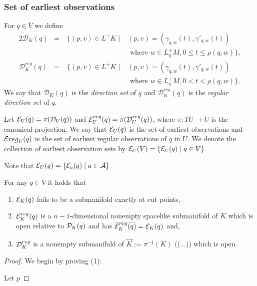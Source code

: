 \subsubsection{Set of earliest observations}
\begin{definition}
For $q\in \overline{V}$ we define
\begin{alignat*}{2}
    \mathcal{D}_K(q) &=\; &\{(p,v)\in L^+K \mid &(p,v) = (\gamma_{q,w}(t),\gamma'_{q,w}(t)) \\
    &&&\text{ where } w\in L_q^+M, 0\leq t \leq \rho(q,w)\},\\
    \mathcal{D}^{reg}_K(q) &=\; &\{(p,v)\in L^+K \mid &(p,v) = (\gamma_{q,w}(t),\gamma'_{q,w}(t)) \\
    &&&\text{ where } w\in L_q^+M, 0 < t < \rho(q,w)\},
\end{alignat*}
We say that $\mathcal{D}_K(q)$ is the \emph{direction set} of $q$ and $\mathcal{D}^{reg}_K(q)$ is the \emph{regular direction set} of $q$.

Let $\mathcal{E}_U(q) = \pi(\mathcal{D}_U(q))$ and $\mathcal{E}^{reg}_U(q) = \pi(\mathcal{D}^{reg}_U(q))$, where $\pi:TU\to U$ is the canonical projection. We say that $\mathcal{E}_U(q)$ is the set of earliest observations and $\mathcal{E}{reg}_U(q)$ is the set of earliest regular observations of $q$ in $U$. We denote the collection of earliest observation sets by $\mathcal{E}_U(V) = \{ \mathcal{E}_U(q) \mid q\in V\}$.
\end{definition}

Note that $\mathcal{E}_U(q) = \{ \mathcal{E}_a(q) \mid a\in \mathcal{A} \}$.

\begin{proposition}\label{prop:submanifolds}
For any $q\in \overline{V}$ it holds that
\begin{enumerate}[label={\textnormal{(\arabic*)}}]
    \item $\mathcal{E}_K(q)$ fails to be a submanifold exactly at cut points,
    \item $\mathcal{E}^{reg}_K(q)$ is a $n-1$-dimensional nonempty spacelike submanifold of $K$ which is open relative to $\mathcal{P}_K(q)$ and has $\overline{\mathcal{E}^{reg}_K(q)} = \mathcal{E}_K(q)$ and,
    \item $\mathcal{D}^{reg}_K$ is a nonempty submanifold of $\overrightarrow{K}:=\pi^{-1}(K)$ ((...)) which is open 
\end{enumerate}
\end{proposition}
\begin{proof}
We begin by proving (1):

Let $p$

\end{proof}

